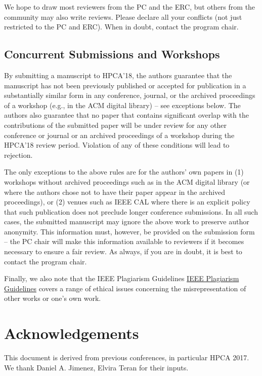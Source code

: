 \documentclass{sig-alternate}
\begin{document}
We hope to draw most reviewers from the PC and the ERC, but others from the
community may also write reviews.  Please declare all your conflicts (not
just restricted to the PC and ERC).  When in doubt, contact the program
chair.

\subsection{Concurrent Submissions and Workshops}

By submitting a manuscript to HPCA'18, the authors guarantee that the
manuscript has not been previously published or accepted for publication in
a substantially similar form in any conference, journal, or the archived
proceedings of a workshop (e.g., in the ACM digital library) -- see
exceptions below. The authors also guarantee that no paper that contains
significant overlap with the contributions of the submitted paper will be
under review for any other conference or journal or an archived proceedings
of a workshop during the HPCA'18 review period. Violation of any of these
conditions will lead to rejection.

The only exceptions to the above rules are for the authors' own papers
in (1) workshops without archived proceedings such as in the ACM
digital library (or where the authors chose not to have their paper
appear in the archived proceedings), or (2) venues such as IEEE CAL
where there is an explicit policy that such publication does not
preclude longer conference submissions.  In all such cases, the
submitted manuscript may ignore the above work to preserve author
anonymity. This information must, however, be provided on the
submission form -- the PC chair will make this information available
to reviewers if it becomes necessary to ensure a fair review.  As
always, if you are in doubt, it is best to contact the program chair.


Finally, we also note that the IEEE Plagiarism Guidelines \href{http://www.ieee.org/publications\_standards/publications/rights/plagiarism.html}{IEEE Plagiarism Guidelines} covers a range of ethical issues concerning the misrepresentation of other works or
one's own work.

\section{Acknowledgements}
This document is derived from previous conferences, in particular HPCA 2017.  We thank Daniel A. Jimenez,  Elvira Teran for their inputs.






\end{document}
